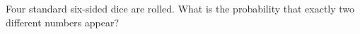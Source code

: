 Four standard six-sided dice are rolled. What is the probability that exactly two different numbers appear?
